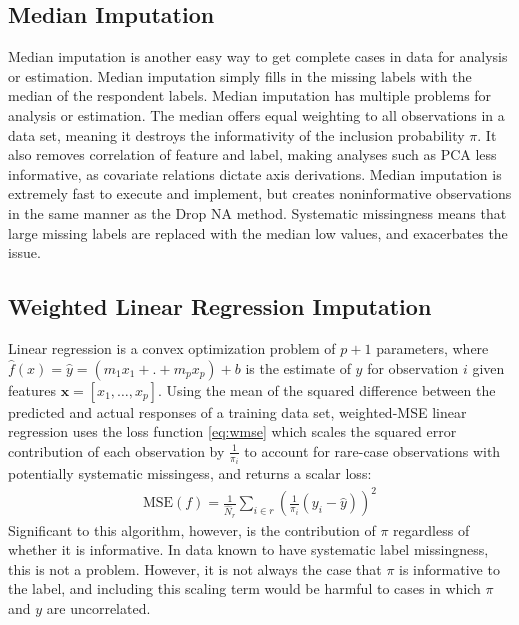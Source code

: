 \documentclass[12pt,twoside]{reedthesis}
\begin{document}
\subsection{Median Imputation}\label{median-imputation}

Median imputation is another easy way to get complete cases in data for
analysis or estimation. Median imputation simply fills in the missing
labels with the median of the respondent labels. Median imputation has
multiple problems for analysis or estimation. The median offers equal
weighting to all observations in a data set, meaning it destroys the
informativity of the inclusion probability \(\pi\). It also removes
correlation of feature and label, making analyses such as PCA less
informative, as covariate relations dictate axis derivations. Median
imputation is extremely fast to execute and implement, but creates
noninformative observations in the same manner as the Drop NA method.
Systematic missingness means that large missing labels are replaced with
the median low values, and exacerbates the issue.

\subsection{Weighted Linear Regression Imputation}\label{sec:linear_reg}

Linear regression is a convex optimization problem of \(p+1\)
parameters, where \(\hat f(x) = \hat y = (m_1x_1 + .+ m_px_p)+b\) is the
estimate of \(y\) for observation \(i\) given features
\(\boldsymbol{x} = [x_1, \dots ,x_p]\). Using the mean of the squared
difference between the predicted and actual responses of a training data
set, weighted-MSE linear regression uses the loss function \eqref{eq:wmse}
which scales the squared error contribution of each observation by
\(\frac{1}{\pi_i}\) to account for rare-case observations with
potentially systematic missingess, and returns a scalar loss:
\begin{align}
\text{MSE}(f) = \frac{1}{\hat N_r} \sum_{i \in r} (\frac{1}{\pi_i}(y_i - \hat{y}))^2 \label{eq:wmse}
\end{align}
Significant to this algorithm, however, is the contribution of \(\pi\)
regardless of whether it is informative. In data known to have
systematic label missingness, this is not a problem. However, it is not
always the case that \(\pi\) is informative to the label, and including
this scaling term would be harmful to cases in which \(\pi\) and \(y\)
are uncorrelated.
\end{document}
